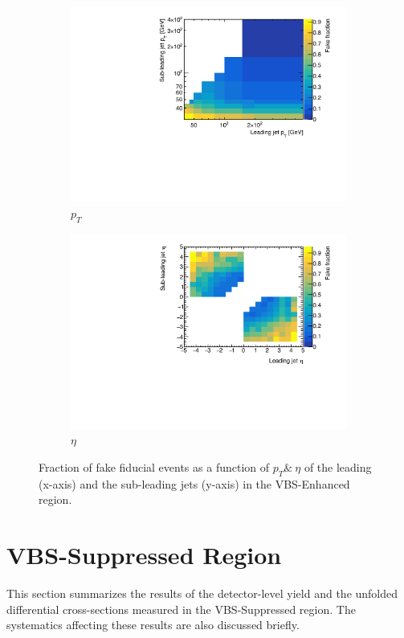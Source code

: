 \begin{figure}[htb]
    \centering
    \begin{subfigure}{.48\textwidth}
        \centering
        \includegraphics[width=.9\linewidth]{figures/Analysis/Unfolding/FakeFraction_pt_jets.pdf}
        \caption{ $p_{T}$ \label{fig:FidFakespT}}
    \end{subfigure}
    \begin{subfigure}{.48\textwidth}
        \centering
        \includegraphics[width=.9\linewidth]{figures/Analysis/Unfolding/FakeFraction_eta_jets.pdf}
        \caption{$\eta$\label{fig:FidFakeseta}}
    \end{subfigure}
    \caption{ Fraction of fake fiducial events as a function of $p_{T}\&~\eta$ of the leading (x-axis) and the sub-leading jets (y-axis) in the VBS-Enhanced region.\label{fig:fake_fraction_jets}}
\end{figure}

\section{VBS-Suppressed Region}
\label{Appendix:VBSSupRegion}
This section summarizes the results of the detector-level yield and the unfolded differential cross-sections measured in the VBS-Suppressed region. The systematics affecting these results are also discussed briefly.

